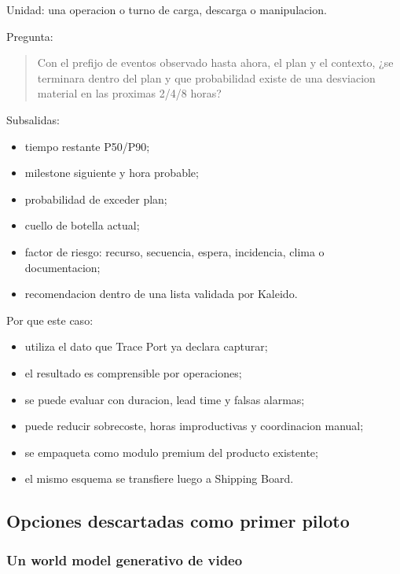 \documentclass[
  spanish,
  10pt,
  a4paper,
]{article}
\providecommand{\tightlist}{%
  \setlength{\itemsep}{0pt}\setlength{\parskip}{0pt}}
\begin{document}
Unidad: una operacion o turno de carga, descarga o manipulacion.

Pregunta:

\begin{quote}
Con el prefijo de eventos observado hasta ahora, el plan y el contexto,
¿se terminara dentro del plan y que probabilidad existe de una
desviacion material en las proximas 2/4/8 horas?
\end{quote}

Subsalidas:

\begin{itemize}
\tightlist
\item
  tiempo restante P50/P90;
\item
  milestone siguiente y hora probable;
\item
  probabilidad de exceder plan;
\item
  cuello de botella actual;
\item
  factor de riesgo: recurso, secuencia, espera, incidencia, clima o
  documentacion;
\item
  recomendacion dentro de una lista validada por Kaleido.
\end{itemize}

Por que este caso:

\begin{itemize}
\tightlist
\item
  utiliza el dato que Trace Port ya declara capturar;
\item
  el resultado es comprensible por operaciones;
\item
  se puede evaluar con duracion, lead time y falsas alarmas;
\item
  puede reducir sobrecoste, horas improductivas y coordinacion manual;
\item
  se empaqueta como modulo premium del producto existente;
\item
  el mismo esquema se transfiere luego a Shipping Board.
\end{itemize}

\subsection{Opciones descartadas como primer
piloto}\label{opciones-descartadas-como-primer-piloto}

\subsubsection{Un world model generativo de
video}\label{un-world-model-generativo-de-video}
\end{document}
